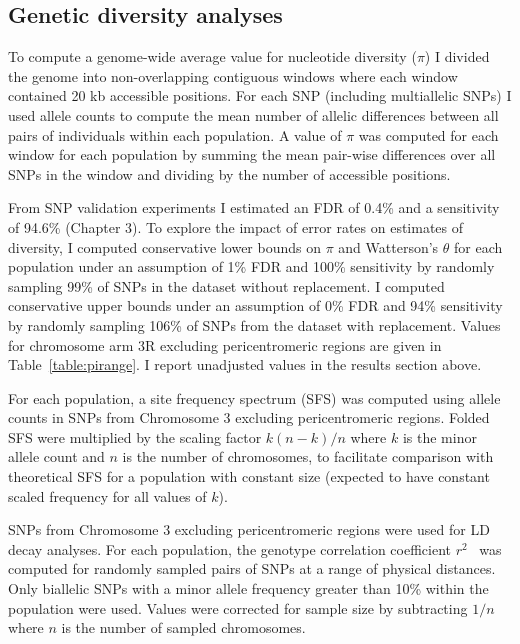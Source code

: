 \begin{refsection}
\subsection{Genetic diversity analyses}\label{subsec:methods-diversity}


To compute a genome-wide average value for nucleotide diversity ($\pi$) I divided the genome into non-overlapping contiguous windows where each window contained 20 kb accessible positions.
%
For each SNP (including multiallelic SNPs) I used allele counts to compute the mean number of allelic differences between all pairs of individuals within each population.
%
A value of $\pi$ was computed for each window for each population by summing the mean pair-wise differences over all SNPs in the window and dividing by the number of accessible positions.


From SNP validation experiments I estimated an FDR of 0.4\% and a sensitivity of 94.6\% (Chapter 3).
%
To explore the impact of error rates on estimates of diversity, I computed conservative lower bounds
on $\pi$ and Watterson's $\theta$ for each population under an assumption of 1\% FDR and 100\% sensitivity by randomly sampling 99\% of SNPs in the dataset without replacement.
%
I computed conservative upper bounds under an assumption of 0\% FDR and 94\% sensitivity by randomly sampling 106\% of SNPs from the dataset with replacement.
%
Values for chromosome arm 3R excluding pericentromeric regions are given in Table~\ref{table:pirange}.
%
I report unadjusted values in the results section above.


For each population, a site frequency spectrum (SFS) was computed using allele counts in SNPs from Chromosome 3 excluding pericentromeric regions.
%
Folded SFS were multiplied by the scaling factor $k (n - k) / n$ where $k$ is the minor allele count and $n$ is the number of chromosomes, to facilitate
comparison with theoretical SFS for a population with constant size (expected to have constant scaled frequency for all values of $k$).


SNPs from Chromosome 3 excluding pericentromeric regions were used for LD decay analyses.
%
For each population, the genotype correlation coefficient $r^2$~\parencite{Rogers2009} was computed for randomly sampled pairs of SNPs at a range of physical distances.
%
Only biallelic SNPs with a minor allele frequency greater than 10\% within the population were used.
%
Values were corrected for sample size by subtracting $1/n$ where $n$ is the number of sampled chromosomes.



\end{refsection}
